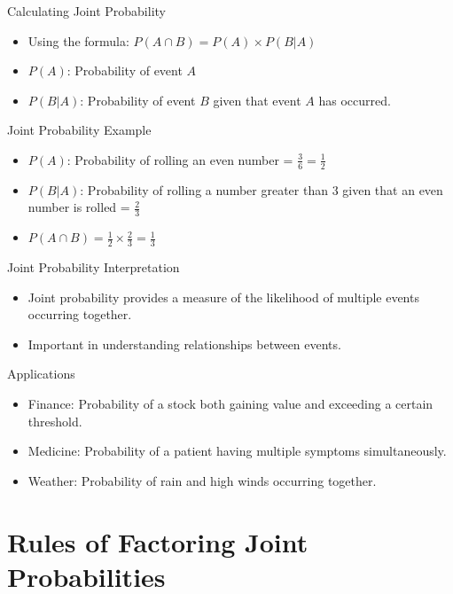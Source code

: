\documentclass{beamer}
\begin{document}
\begin{frame}{Calculating Joint Probability}
  \begin{itemize}
    \item Using the formula: \( P(A \cap B) = P(A) \times P(B|A) \)
    \item \( P(A) \): Probability of event \( A \)
    \item \( P(B|A) \): Probability of event \( B \) given that event \( A \) has occurred.
  \end{itemize}
\end{frame}

\begin{frame}{Joint Probability Example}
  \begin{itemize}
    \item \( P(A) \): Probability of rolling an even number = \( \frac{3}{6} = \frac{1}{2} \)
    \item \( P(B|A) \): Probability of rolling a number greater than 3 given that an even number is rolled = \( \frac{2}{3} \)
    \item \( P(A \cap B) = \frac{1}{2} \times \frac{2}{3} = \frac{1}{3} \)
  \end{itemize}
\end{frame}

\begin{frame}{Joint Probability Interpretation}
  \begin{itemize}
    \item Joint probability provides a measure of the likelihood of multiple events occurring together.
    \item Important in understanding relationships between events.
  \end{itemize}
\end{frame}

\begin{frame}{Applications}
  \begin{itemize}
    \item Finance: Probability of a stock both gaining value and exceeding a certain threshold.
    \item Medicine: Probability of a patient having multiple symptoms simultaneously.
    \item Weather: Probability of rain and high winds occurring together.
  \end{itemize}
\end{frame}


\section{Rules of Factoring Joint Probabilities}
\end{document}
